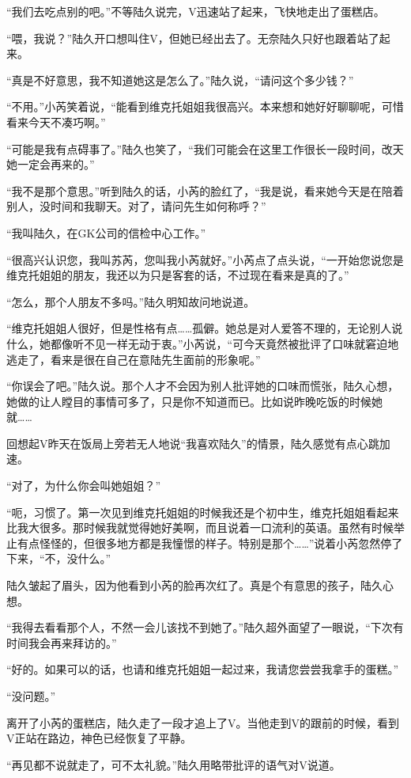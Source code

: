“我们去吃点别的吧。”不等陆久说完，V迅速站了起来，飞快地走出了蛋糕店。

“喂，我说？”陆久开口想叫住V，但她已经出去了。无奈陆久只好也跟着站了起来。

“真是不好意思，我不知道她这是怎么了。”陆久说，“请问这个多少钱？”

“不用。”小芮笑着说，“能看到维克托姐姐我很高兴。本来想和她好好聊聊呢，可惜看来今天不凑巧啊。”

“可能是我有点碍事了。”陆久也笑了，“我们可能会在这里工作很长一段时间，改天她一定会再来的。”

“我不是那个意思。”听到陆久的话，小芮的脸红了，“我是说，看来她今天是在陪着别人，没时间和我聊天。对了，请问先生如何称呼？”

“我叫陆久，在GK公司的信检中心工作。”

“很高兴认识您，我叫苏芮，您叫我小芮就好。”小芮点了点头说，“一开始您说您是维克托姐姐的朋友，我还以为只是客套的话，不过现在看来是真的了。”

“怎么，那个人朋友不多吗。”陆久明知故问地说道。

“维克托姐姐人很好，但是性格有点……孤僻。她总是对人爱答不理的，无论别人说什么，她都像听不见一样无动于衷。”小芮说，“可今天竟然被批评了口味就窘迫地逃走了，看来是很在自己在意陆先生面前的形象呢。”

“你误会了吧。”陆久说。那个人才不会因为别人批评她的口味而慌张，陆久心想，她做的让人瞠目的事情可多了，只是你不知道而已。比如说昨晚吃饭的时候她就……

回想起V昨天在饭局上旁若无人地说“我喜欢陆久”的情景，陆久感觉有点心跳加速。

“对了，为什么你会叫她姐姐？”

“呃，习惯了。第一次见到维克托姐姐的时候我还是个初中生，维克托姐姐看起来比我大很多。那时候我就觉得她好美啊，而且说着一口流利的英语。虽然有时候举止有点怪怪的，但很多地方都是我憧憬的样子。特别是那个……”说着小芮忽然停了下来，“不，没什么。”

陆久皱起了眉头，因为他看到小芮的脸再次红了。真是个有意思的孩子，陆久心想。

“我得去看看那个人，不然一会儿该找不到她了。”陆久超外面望了一眼说，“下次有时间我会再来拜访的。”

“好的。如果可以的话，也请和维克托姐姐一起过来，我请您尝尝我拿手的蛋糕。”

“没问题。”

离开了小芮的蛋糕店，陆久走了一段才追上了V。当他走到V的跟前的时候，看到V正站在路边，神色已经恢复了平静。

“再见都不说就走了，可不太礼貌。”陆久用略带批评的语气对V说道。

